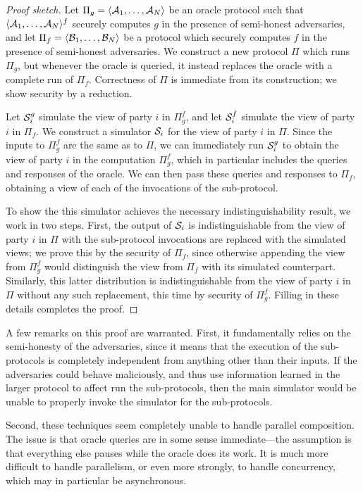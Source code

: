 \begin{proof}[Proof sketch]
  Let $\Pi_g = \langle\mathcal{A}_1,\dots,\mathcal{A}_N\rangle$ be an oracle protocol such that
  $\langle\mathcal{A}_1,\dots,\mathcal{A}_N\rangle^f$ securely computes $g$ in the presence of semi-honest
  adversaries, and let $\Pi_f = \langle\mathcal{B}_1,\dots,\mathcal{B}_N\rangle$ be a protocol which securely
  computes $f$ in the presence of semi-honest adversaries. We construct a new
  protocol $\Pi$ which runs $\Pi_g$, but whenever the oracle is queried, it
  instead replaces the oracle with a complete run of $\Pi_f$. Correctness of
  $\Pi$ is immediate from its construction; we show security by a reduction.

  Let $\mathcal{S}^g_i$ simulate the view of party $i$ in $\Pi_g^f$, and let $\mathcal{S}^f_i$
  simulate the view of party $i$ in $\Pi_f$. We construct a simulator $\mathcal{S}_i$
  for the view of party $i$ in $\Pi$. Since the inputs to $\Pi_g^f$ are the same
  as to $\Pi$, we can immediately run $\mathcal{S}^g_i$ to obtain the view of party $i$
  in the computation $\Pi_g^f$, which in particular includes the queries and
  responses of the oracle. We can then pass these queries and responses to
  $\Pi_f$, obtaining a view of each of the invocations of the sub-protocol.

  To show the this simulator achieves the necessary indistinguishability result,
  we work in two steps. First, the output of $\mathcal{S}_i$ is indistinguishable from
  the view of party $i$ in $\Pi$ with the sub-protocol invocations are
  replaced with the simulated views; we prove this by the security of $\Pi_f$,
  since otherwise appending the view from $\Pi_g^f$ would distinguish the view
  from $\Pi_f$ with its simulated counterpart. Similarly, this latter distribution
  is indistinguishable from the view of party $i$ in $\Pi$ without any such
  replacement, this time by security of $\Pi_g^f$. Filling in these details
  completes the proof.
\end{proof}

A few remarks on this proof are warranted. First, it fundamentally relies on the
semi-honesty of the adversaries, since it means that the execution of the
sub-protocols is completely independent from anything other than their inputs.
If the adversaries could behave maliciously, and thus use information learned in
the larger protocol to affect run the sub-protocols, then the main simulator would be
unable to properly invoke the simulator for the sub-protocols.

Second, these techniques seem completely unable to handle parallel composition.
The issue is that oracle queries are in some sense immediate---the assumption is
that everything else pauses while the oracle does its work. It is much more
difficult to handle parallelism, or even more strongly, to handle concurrency,
which may in particular be asynchronous.

